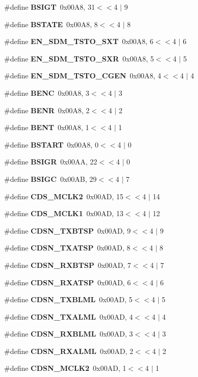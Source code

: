 \begin{DoxyCompactItemize}
\#define {\bf B\+S\+I\+GT}~0x00\+A8, 31$<$$<$4 $\vert$  9
\item 
\#define {\bf B\+S\+T\+A\+TE}~0x00\+A8, 8$<$$<$4 $\vert$  8
\item 
\#define {\bf E\+N\+\_\+\+S\+D\+M\+\_\+\+T\+S\+T\+O\+\_\+\+S\+XT}~0x00\+A8, 6$<$$<$4 $\vert$  6
\item 
\#define {\bf E\+N\+\_\+\+S\+D\+M\+\_\+\+T\+S\+T\+O\+\_\+\+S\+XR}~0x00\+A8, 5$<$$<$4 $\vert$  5
\item 
\#define {\bf E\+N\+\_\+\+S\+D\+M\+\_\+\+T\+S\+T\+O\+\_\+\+C\+G\+EN}~0x00\+A8, 4$<$$<$4 $\vert$  4
\item 
\#define {\bf B\+E\+NC}~0x00\+A8, 3$<$$<$4 $\vert$  3
\item 
\#define {\bf B\+E\+NR}~0x00\+A8, 2$<$$<$4 $\vert$  2
\item 
\#define {\bf B\+E\+NT}~0x00\+A8, 1$<$$<$4 $\vert$  1
\item 
\#define {\bf B\+S\+T\+A\+RT}~0x00\+A8, 0$<$$<$4 $\vert$  0
\item 
\#define {\bf B\+S\+I\+GR}~0x00\+A\+A, 22$<$$<$4 $\vert$  0
\item 
\#define {\bf B\+S\+I\+GC}~0x00\+A\+B, 29$<$$<$4 $\vert$  7
\item 
\#define {\bf C\+D\+S\+\_\+\+M\+C\+L\+K2}~0x00\+A\+D, 15$<$$<$4 $\vert$  14
\item 
\#define {\bf C\+D\+S\+\_\+\+M\+C\+L\+K1}~0x00\+A\+D, 13$<$$<$4 $\vert$  12
\item 
\#define {\bf C\+D\+S\+N\+\_\+\+T\+X\+B\+T\+SP}~0x00\+A\+D, 9$<$$<$4 $\vert$  9
\item 
\#define {\bf C\+D\+S\+N\+\_\+\+T\+X\+A\+T\+SP}~0x00\+A\+D, 8$<$$<$4 $\vert$  8
\item 
\#define {\bf C\+D\+S\+N\+\_\+\+R\+X\+B\+T\+SP}~0x00\+A\+D, 7$<$$<$4 $\vert$  7
\item 
\#define {\bf C\+D\+S\+N\+\_\+\+R\+X\+A\+T\+SP}~0x00\+A\+D, 6$<$$<$4 $\vert$  6
\item 
\#define {\bf C\+D\+S\+N\+\_\+\+T\+X\+B\+L\+ML}~0x00\+A\+D, 5$<$$<$4 $\vert$  5
\item 
\#define {\bf C\+D\+S\+N\+\_\+\+T\+X\+A\+L\+ML}~0x00\+A\+D, 4$<$$<$4 $\vert$  4
\item 
\#define {\bf C\+D\+S\+N\+\_\+\+R\+X\+B\+L\+ML}~0x00\+A\+D, 3$<$$<$4 $\vert$  3
\item 
\#define {\bf C\+D\+S\+N\+\_\+\+R\+X\+A\+L\+ML}~0x00\+A\+D, 2$<$$<$4 $\vert$  2
\item 
\#define {\bf C\+D\+S\+N\+\_\+\+M\+C\+L\+K2}~0x00\+A\+D, 1$<$$<$4 $\vert$  1

\end{DoxyCompactItemize}
